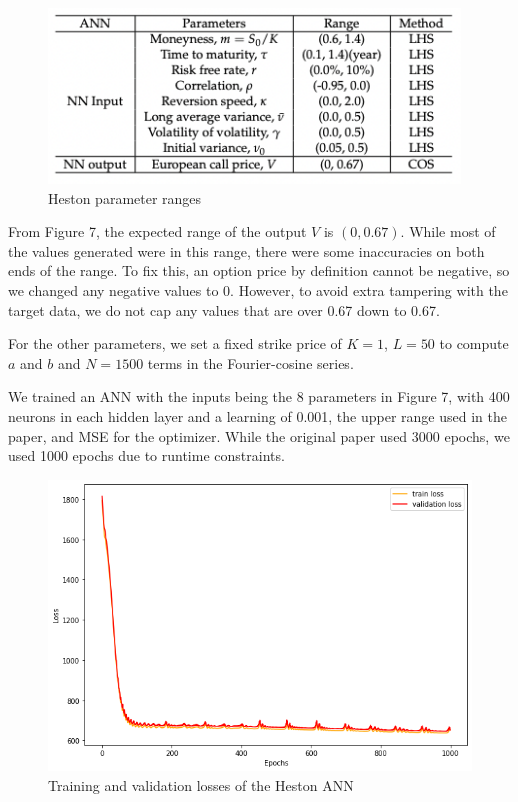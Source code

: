 \documentclass[12pt,a4paper]{article}
\begin{document}
\begin{figure}[H]
    \centering
    \includegraphics[width=310pt]{hestonParameterRanges.png}
    \caption{Heston parameter ranges}
\end{figure} 

From Figure 7, the expected range of the output $V$ is $(0, 0.67)$. While most of the values generated were in this range, there were some inaccuracies on both ends of the range. To fix this, an option price by definition cannot be negative, so we changed any negative values to 0. However, to avoid extra tampering with the target data, we do not cap any values that are over 0.67 down to 0.67.

For the other parameters, we set a fixed strike price of $K=1$, $L=50$ to compute $a$ and $b$ and $N=1500$ terms in the Fourier-cosine series.

We trained an ANN with the inputs being the 8 parameters in Figure 7, with 400 neurons in each hidden layer and a learning of 0.001, the upper range used in the paper, and MSE for the optimizer. While the original paper used 3000 epochs, we used 1000 epochs due to runtime constraints.

\begin{figure}[H]
    \centering
    \includegraphics[width=370pt]{hestonLossGraph.png}
    \caption{Training and validation losses of the Heston ANN}
\end{figure}
\end{document}

